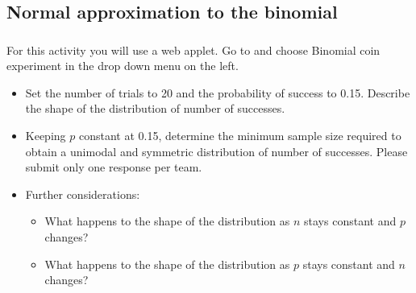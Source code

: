 \begin{frame}
\vfill


\end{frame}


\subsection{Normal approximation to the binomial}


\begin{frame}
\frametitle{}

{
For this activity you will use a web applet. Go to  and choose Binomial coin experiment in the drop down menu on the left.
\begin{itemize}
\item Set the number of trials to 20 and the probability of success to 0.15. Describe the shape of the distribution of number of successes. 
\item Keeping $p$ constant at 0.15, determine the minimum sample size required to obtain a unimodal and symmetric distribution of number of successes. Please submit only one response per team.
\item Further considerations:
\begin{itemize}
\item What happens to the shape of the distribution as $n$ stays constant and $p$ changes?
\item What happens to the shape of the distribution as $p$ stays constant and $n$ changes?
\end{itemize}
\end{itemize}
}

\end{frame}


